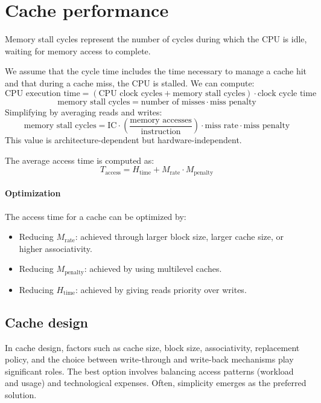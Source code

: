 \section{Cache performance}

\begin{definition}
    Memory stall cycles represent the number of cycles during which the CPU is idle, waiting for memory access to complete.
\end{definition}
We assume that the cycle time includes the time necessary to manage a cache hit and that during a cache miss, the CPU is stalled. 
We can compute:
\[\text{CPU execution time}=\left(\text{CPU clock cycles}+\text{memory stall cycles} \right) \cdot \text{clock cycle time}\]
\[\text{memory stall cycles}=\text{number of misses} \cdot \text{miss penalty}\]
Simplifying by averaging reads and writes:
\[\text{memory stall cycles} = \text{IC} \cdot \left(\dfrac{\text{memory accesses}}{\text{instruction}}\right)\cdot \text{miss rate} \cdot \text{miss penalty}\]
This value is architecture-dependent but hardware-independent.

The average access time is computed as:
\[T_{\text{access}} = H_{\text{time}} + M_{\text{rate}} \cdot M_{\text{penalty}}\]

\paragraph*{Optimization}
The access time for a cache can be optimized by:
\begin{itemize}
    \item Reducing $M_{\text{rate}}$: achieved through larger block size, larger cache size, or higher associativity.
    \item Reducing $M_{\text{penalty}}$: achieved by using multilevel caches.
    \item Reducing $H_{\text{time}}$: achieved by giving reads priority over writes.
\end{itemize}

\subsection{Cache design}
In cache design, factors such as cache size, block size, associativity, replacement policy, and the choice between write-through and write-back mechanisms play significant roles.
The best option involves balancing access patterns (workload and usage) and technological expenses. 
Often, simplicity emerges as the preferred solution.

